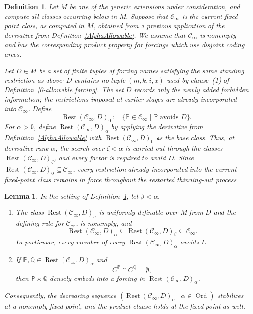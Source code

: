 \documentclass[a4paper,11pt]{article}
\newtheorem{lemma}[theorem]{Lemma}
\newtheorem{definition}[theorem]{Definition}
\newcommand{\forceP}{\mathbb{P}}
\newcommand{\forceQ}{\mathbb{Q}}
\begin{document}
\begin{definition}\label{RestartThinningOut}
Let $M$ be one of the generic extensions under consideration, and compute all classes occurring below in $M$. Suppose that $\mathcal C_\infty$ is the current fixed-point class, as computed in $M$, obtained from a previous application of the derivative from Definition~\ref{AlphaAllowable}. We assume that $\mathcal C_\infty$ is nonempty and has the corresponding product property for forcings which use disjoint coding areas.

Let $D\in M$ be a set of finite tuples of forcing names satisfying the same standing restriction as above: $D$ contains no tuple $(m,k,i,\dot x)$ used by clause~(1) of Definition~\ref{0-allowable forcing}. The set $D$ records only the newly added forbidden information; the restrictions imposed at earlier stages are already incorporated into $\mathcal C_\infty$. Define
\[
\operatorname{Rest}(\mathcal C_\infty,D)_0:=\{\forceP\in\mathcal C_\infty\mid\forceP\text{ avoids }D\}.
\]
For $\alpha>0$, define $\operatorname{Rest}(\mathcal C_\infty,D)_\alpha$ by applying the derivative from Definition~\ref{AlphaAllowable} with $\operatorname{Rest}(\mathcal C_\infty,D)_0$ as the base class. Thus, at derivative rank $\alpha$, the search over $\zeta<\alpha$ is carried out through the classes $\operatorname{Rest}(\mathcal C_\infty,D)_\zeta$, and every factor is required to avoid $D$. Since $\operatorname{Rest}(\mathcal C_\infty,D)_0\subseteq\mathcal C_\infty$, every restriction already incorporated into the current fixed-point class remains in force throughout the restarted thinning-out process.
\end{definition}

\begin{lemma}\label{RestartThinningProperties}
In the setting of Definition~\ref{RestartThinningOut}, let $\beta<\alpha$.
\begin{enumerate}
\item The class $\operatorname{Rest}(\mathcal C_\infty,D)_\alpha$ is uniformly definable over $M$ from $D$ and the defining rule for $\mathcal C_\infty$, is nonempty, and
\[
\operatorname{Rest}(\mathcal C_\infty,D)_\alpha\subseteq\operatorname{Rest}(\mathcal C_\infty,D)_\beta\subseteq\mathcal C_\infty.
\]
In particular, every member of every $\operatorname{Rest}(\mathcal C_\infty,D)_\alpha$ avoids $D$.
\item If $\forceP,\forceQ\in\operatorname{Rest}(\mathcal C_\infty,D)_\alpha$ and
\[
C^{\forceP}\cap C^{\forceQ}=\emptyset,
\]
then $\forceP\times\forceQ$ densely embeds into a forcing in $\operatorname{Rest}(\mathcal C_\infty,D)_\alpha$.
\end{enumerate}
Consequently, the decreasing sequence $(\operatorname{Rest}(\mathcal C_\infty,D)_\alpha\mid\alpha\in\operatorname{Ord})$ stabilizes at a nonempty fixed point, and the product clause holds at the fixed point as well.
\end{lemma}
\end{document}
